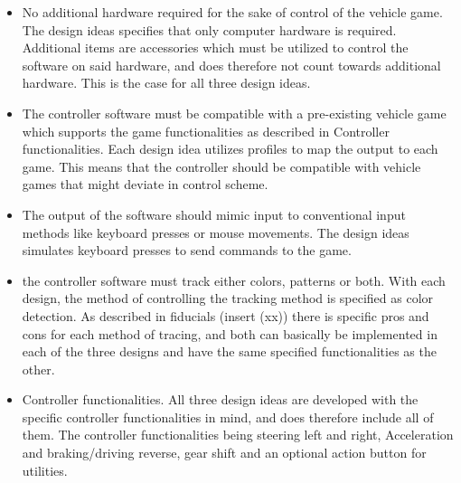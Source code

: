 \begin{itemize}
\item No additional hardware required for the sake of control of the vehicle game.\newline
The design ideas specifies that only computer hardware is required. Additional items are accessories which must be utilized to control the software on said hardware, and does therefore not count towards additional hardware. This is the case for all three design ideas.

\item The controller software must be compatible with a pre-existing vehicle game which supports
the game functionalities as described in Controller functionalities.\newline
Each design idea utilizes profiles to map the output to each game. This means that the controller should be compatible with vehicle games that might deviate in control scheme.

\item The output of the software should mimic input to conventional input methods like keyboard
presses or mouse movements.\newline
The design ideas simulates keyboard presses to send commands to the game. 

\item the controller software must track either colors, patterns or both.\newline
With each design, the method of controlling the tracking method is specified as color detection. As described in fiducials (insert (xx)) there is specific pros and cons for each method of tracing, and both can basically be implemented in each of the three designs and have the same specified functionalities as the other.

\item Controller functionalities.\newline
All three design ideas are developed with the specific controller functionalities in mind, and does therefore include all of them. The controller functionalities being steering left and right, Acceleration and braking/driving reverse, gear shift and an optional action button for utilities.

\end{itemize}